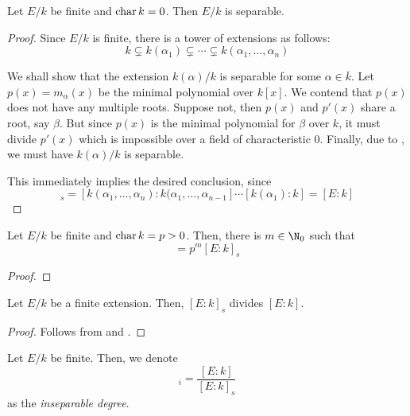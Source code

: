 \begin{theorem}
    Let $E/k$ be finite and $\operatorname{char} k = 0$. Then $E/k$ is separable.
\end{theorem}
\begin{proof}
    Since $E/k$ is finite, there is a tower of extensions as follows: 
    \begin{equation*}
        k\subsetneq k(\alpha_1)\subsetneq\cdots\subsetneq k(\alpha_1,\ldots,\alpha_n)
    \end{equation*}

    We shall show that the extension $k(\alpha)/k$ is separable for some $\alpha\in\overline{k}$. Let $p(x) = m_\alpha(x)$ be the minimal polynomial over $k[x]$. We contend that $p(x)$ does not have any multiple roots. Suppose not, then $p(x)$ and $p'(x)$ share a root, say $\beta$. But since $p(x)$ is the minimal polynomial for $\beta$ over $k$, it must divide $p'(x)$ which is impossible over a field of characteristic $0$. Finally, due to , we must have $k(\alpha)/k$ is separable.

    This immediately implies the desired conclusion, since 
    \begin{equation*}
        [E:k]_s = [k(\alpha_1,\ldots,\alpha_n): k(\alpha_1,\ldots,\alpha_{n - 1}]\cdots[k(\alpha_1): k] = [E:k]
    \end{equation*}
\end{proof}

\begin{theorem}
    Let $E/k$ be finite and $\operatorname{char} k = p > 0$. Then, there is $m\in\N_0$ such that 
    \begin{equation*}
        [E:k] = p^m[E:k]_s
    \end{equation*}
\end{theorem}
\begin{proof}
    
\end{proof}

\begin{corollary}
    Let $E/k$ be a finite extension. Then, $[E:k]_s$ divides $[E:k]$. 
\end{corollary}
\begin{proof}
    Follows from  and .
\end{proof}

\begin{definition}
    Let $E/k$ be finite. Then, we denote 
    \begin{equation*}
        [E:k]_i = \frac{[E:k]}{[E:k]_s}
    \end{equation*}
    as the \textit{inseparable degree}.
\end{definition}

